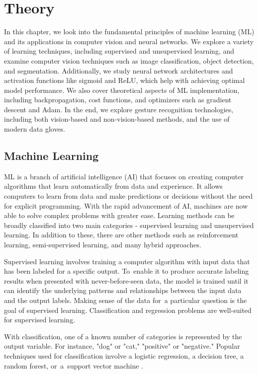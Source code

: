 \chapter{Theory}
In this chapter, we look into the fundamental principles of machine learning (ML) and its applications in computer vision and neural networks. We explore a variety of learning techniques, including supervised and unsupervised learning, and examine computer vision techniques such as image classification, object detection, and segmentation. Additionally, we study neural network architectures and activation functions like sigmoid and ReLU, which help with achieving optimal model performance. We also cover theoretical aspects of ML implementation, including backpropagation, cost functions, and optimizers such as gradient descent and Adam. In the end, we explore gesture recognition technologies, including both vision-based and non-vision-based methods, and the use of modern data gloves.

    
\section{Machine Learning}
ML is a branch of artificial intelligence (AI) that focuses on creating computer algorithms that learn automatically from data and experience. It allows computers to learn from data and make predictions or decisions without the need for explicit programming.
With the rapid advancement of AI, machines are now able to solve complex problems with greater ease. \cite{nielsenneural} Learning methods can be broadly classified into two main categories - supervised learning and unsupervised learning. In addition to these, there are other methods such as reinforcement learning, semi-supervised learning, and many hybrid approaches.

Supervised learning involves training a computer algorithm with input data that has been labeled for a specific output. To enable it to produce accurate labeling results when presented with never-before-seen data, the model is trained until it can identify the underlying patterns and relationships between the input data and the output labels. Making sense of the data for a particular question is the goal of supervised learning. Classification and regression problems are well-suited for supervised learning. 


With classification, one of a known number of categories is represented by the output variable. For instance, "dog" or "cat," "positive" or "negative." Popular techniques used for classification involve a logistic regression, a decision tree, a random forest, or~a~support vector machine \cite{decisiontree}.



